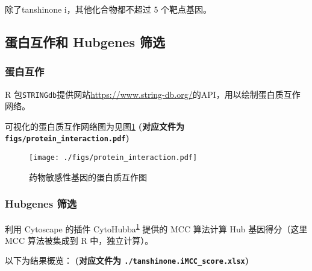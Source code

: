 \documentclass[
]{article}
\begin{document}
除了tanshinone i，其他化合物都不超过 5 个靶点基因。

\hypertarget{ux86cbux767dux4e92ux4f5cux548c-hubgenes-ux7b5bux9009}{%
\subsection{蛋白互作和 Hubgenes 筛选}\label{ux86cbux767dux4e92ux4f5cux548c-hubgenes-ux7b5bux9009}}

\hypertarget{ux86cbux767dux4e92ux4f5c}{%
\subsubsection{蛋白互作}\label{ux86cbux767dux4e92ux4f5c}}

R 包\texttt{STRINGdb}提供网站\url{https://www.string-db.org/}的API，用以绘制蛋白质互作网络。

可视化的蛋白质互作网络图为见图\ref{fig:fig4}
\textbf{(对应文件为 \texttt{figs/protein\_interaction.pdf})}

\begin{figure}
\centering
\texttt{[image: ./figs/protein\_interaction.pdf]}
\caption{\label{fig:fig4}药物敏感性基因的蛋白质互作图}
\end{figure}

\hypertarget{hubgenes-ux7b5bux9009}{%
\subsubsection{Hubgenes 筛选}\label{hubgenes-ux7b5bux9009}}

利用 Cytoscape 的插件 CytoHubba\textsuperscript{\protect\hyperlink{ref-CytohubbaIdenChin2014}{1}} 提供的 MCC 算法计算
Hub 基因得分（这里 MCC 算法被集成到 R 中，独立计算）。

以下为结果概览：
\textbf{(对应文件为 \texttt{./tanshinone.iMCC\_score.xlsx})}
\end{document}
